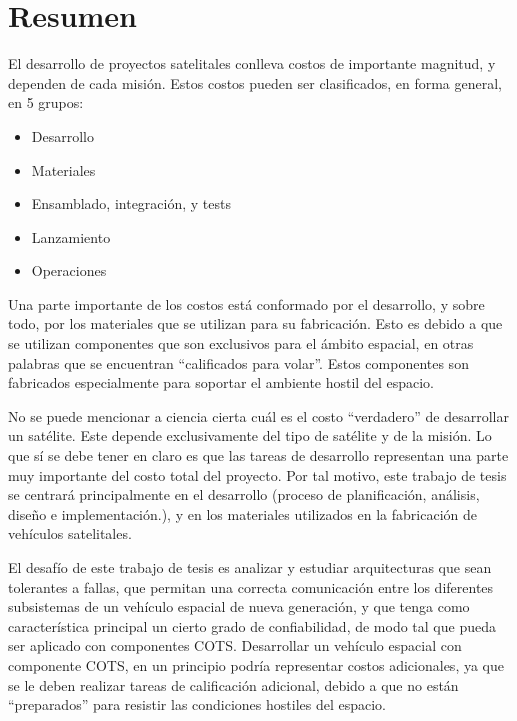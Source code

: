 \chapter*{Resumen} %

El desarrollo de proyectos satelitales conlleva costos de importante magnitud, y 
dependen de cada misión. Estos costos pueden ser clasificados, en forma general, en
5 grupos:

\begin{itemize}
 \item Desarrollo
 \item Materiales
 \item Ensamblado, integración, y tests
 \item Lanzamiento
 \item Operaciones
\end{itemize}

Una parte importante de los costos está conformado por el 
desarrollo, y sobre todo, por los materiales que se utilizan para su fabricación. Esto 
es debido a que se utilizan componentes que son exclusivos para el ámbito espacial, en otras 
palabras que se encuentran ``calificados para volar''. Estos componentes son fabricados especialmente para soportar el ambiente hostil del espacio.

No se puede mencionar a ciencia cierta cuál es el costo “verdadero” de desarrollar un satélite. Este 
depende exclusivamente del tipo de satélite y de la misión. Lo que sí se debe tener en claro es que 
las tareas de desarrollo representan una parte muy importante del costo total del proyecto. Por tal
motivo, este trabajo de tesis se centrará principalmente en el desarrollo (proceso de planificación, 
análisis, diseño e implementación.), y en los materiales utilizados en la fabricación de vehículos satelitales.

El desafío de este trabajo de tesis es analizar y estudiar arquitecturas que sean tolerantes a 
fallas, que permitan una correcta comunicación entre los diferentes subsistemas de un vehículo 
espacial de nueva generación, y que tenga como característica principal un cierto grado de confiabilidad, de modo tal que pueda ser aplicado con componentes \ac{COTS}. Desarrollar un vehículo espacial con componente \ac{COTS}, en un principio podría representar costos 
adicionales, ya que se le deben realizar tareas de calificación adicional, debido a que no están 
“preparados” para resistir las condiciones hostiles del espacio.

